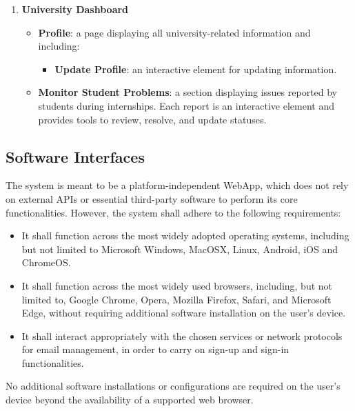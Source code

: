 \begin{enumerate}
    \item \textbf{University Dashboard}
    \begin{itemize}
        \item \textbf{Profile}: a page displaying all university-related information and including:
        \begin{itemize}
            \item \textbf{Update Profile}: an interactive element for updating information.
        \end{itemize}   
        \item \textbf{Monitor Student Problems}: a section displaying issues reported by students during internships. Each report is an interactive element and provides tools to review, resolve, and update statuses.
    \end{itemize}
\end{enumerate}

\subsection{Software Interfaces}
\label{subsec:software_interfaces}

The system is meant to be a platform-independent WebApp, which does not rely on external APIs or essential third-party software to perform its core functionalities. 
However, the system shall adhere to the following requirements:

\begin{itemize}
    \item It shall function across the most widely adopted operating systems, including but not limited to Microsoft Windows, MacOSX, Linux, Android, iOS and ChromeOS.
    
    \item It shall function across the most widely used browsers, including, but not limited to, Google Chrome, Opera, Mozilla Firefox, Safari, and Microsoft Edge, without requiring additional software installation on the user’s device.

    \item It shall interact appropriately with the chosen services or network protocols for email management, in order to carry on sign-up and sign-in functionalities.
\end{itemize}

No additional software installations or configurations are required on the user's device beyond the availability of a supported web browser.

